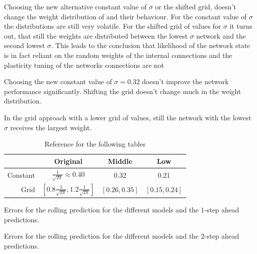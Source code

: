 Choosing the new alternative constant value of $\sigma$ or the shifted grid, doesn't change the weight distribution of and their behaviour. For the constant value of $\sigma$ the distributions are still very volatile. For the shifted grid of values for $\sigma$ it turns out, that still the weights are distributed between the lowest $\sigma$ network and the second lowest $\sigma$. This leads to the conclusion that likelihood of the network state is in fact reliant on the random weights of the internal connections and the plasticity tuning of the networks connections are not 

Choosing the new constant value of $\sigma = 0.32$ doesn't improve the network performance significantly. Shifting the grid doesn't change much in the weight distribution.

In the grid approach with a lower grid of values, still the network with the lowest $\sigma$ receives the largest weight.


\begin{table}[H]
    \begin{center}
        \begin{tabular}{r|c|c|c}
            & Original & Middle & Low \\\hline
            Constant & $\frac{1}{\sqrt{2\pi}} \approx 0.40$ & 0.32 & 0.21 \\\hline
            Grid & $\left[0.8\frac{1}{\sqrt{2\pi}}, 1.2\frac{1}{\sqrt{2\pi}}\right]$ & $\left[0.26, 0.35\right]$ & $\left[0.15, 0.24\right]$ 
        \end{tabular}
    \end{center}
    \caption{Reference for the following tables}
\end{table}

\begin{table}[H]
    \begin{center}
        
    \end{center}
    \caption{Errors for the rolling prediction for the different models and the $1$-step ahead predictions.}
    \label{TABLE:Appendix:1step}
\end{table} 

\begin{table}[H]
    \begin{center}
        
    \end{center}
    \caption{Errors for the rolling  prediction for the different models and the $2$-step ahead predictions.}
    \label{TABLE:Appendix:2step}
\end{table} 

